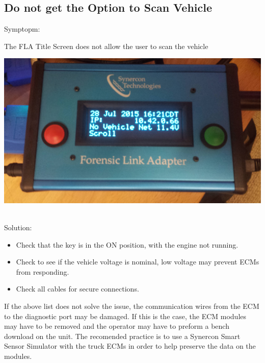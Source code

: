 \documentclass[11pt]{article}
\begin{document}
\subsection{Do not get the Option to Scan Vehicle}
Symptopm:\\
\noindent\begin{minipage}{0.3\textwidth}%
The FLA Title Screen does not allow the user to scan the vehicle
\end{minipage}%
\hfill%
\begin{minipage}{0.6\textwidth}
\includegraphics[width=\linewidth]{../media/fla_screens/title_screen_no_veh_net}
\end{minipage}\\
Solution:\\
\begin{itemize}
\item Check that the key is in the ON position, with the engine not running.
\item Check to see if the vehicle voltage is nominal, low voltage may prevent ECMs from responding.
\item Check all cables for secure connections.
\end{itemize}
If the above list does not solve the issue, the communication wires from the ECM to the diagnostic port may be damaged. If this is the case, the ECM modules may have to be removed and the operator may have to preform a bench download on the unit. The recomended practice is to use a Synercon Smart Sensor Simulator with the truck ECMs in order to help preserve the data on the modules.
\end{document}
